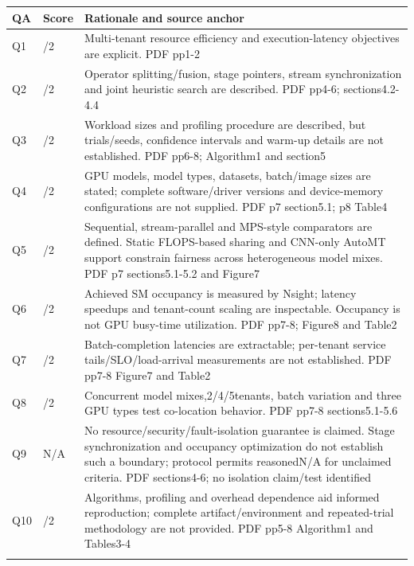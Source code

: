 \begin{longtable}{>{\raggedright\arraybackslash}p{}>{\raggedright\arraybackslash}p{}>{\raggedright\arraybackslash}p{}}
\toprule
\textbf{QA} & \textbf{Score} & \textbf{Rationale and source anchor}\\\midrule\endhead
Q1 & 2/2 & Multi-tenant resource efficiency and execution-latency objectives are explicit. PDF pp1-2\\\addlinespace
Q2 & 2/2 & Operator splitting/fusion,\allowbreak{} stage pointers,\allowbreak{} stream synchronization and joint heuristic search are described. PDF pp4-6;\allowbreak{} sections4.2-4.4\\\addlinespace
Q3 & 1/2 & Workload sizes and profiling procedure are described,\allowbreak{} but trials/seeds,\allowbreak{} confidence intervals and warm-up details are not established. PDF pp6-8;\allowbreak{} Algorithm1 and section5\\\addlinespace
Q4 & 1/2 & GPU models,\allowbreak{} model types,\allowbreak{} datasets,\allowbreak{} batch/image sizes are stated;\allowbreak{} complete software/driver versions and device-memory configurations are not supplied. PDF p7 section5.1;\allowbreak{} p8 Table4\\\addlinespace
Q5 & 1/2 & Sequential,\allowbreak{} stream-parallel and MPS-style comparators are defined. Static FLOPS-based sharing and CNN-only AutoMT support constrain fairness across heterogeneous model mixes. PDF p7 sections5.1-5.2 and Figure7\\\addlinespace
Q6 & 2/2 & Achieved SM occupancy is measured by Nsight;\allowbreak{} latency speedups and tenant-count scaling are inspectable. Occupancy is not GPU busy-time utilization. PDF pp7-8;\allowbreak{} Figure8 and Table2\\\addlinespace
Q7 & 1/2 & Batch-completion latencies are extractable;\allowbreak{} per-tenant service tails/SLO/load-arrival measurements are not established. PDF pp7-8 Figure7 and Table2\\\addlinespace
Q8 & 2/2 & Concurrent model mixes,\allowbreak{}2/4/5tenants,\allowbreak{} batch variation and three GPU types test co-location behavior. PDF pp7-8 sections5.1-5.6\\\addlinespace
Q9 & N/A & No resource/security/fault-isolation guarantee is claimed. Stage synchronization and occupancy optimization do not establish such a boundary;\allowbreak{} protocol permits reasonedN/A for unclaimed criteria. PDF sections4-6;\allowbreak{} no isolation claim/test identified\\\addlinespace
Q10 & 1/2 & Algorithms,\allowbreak{} profiling and overhead dependence aid informed reproduction;\allowbreak{} complete artifact/environment and repeated-trial methodology are not provided. PDF pp5-8 Algorithm1 and Tables3-4\\\addlinespace
\bottomrule\end{longtable}
